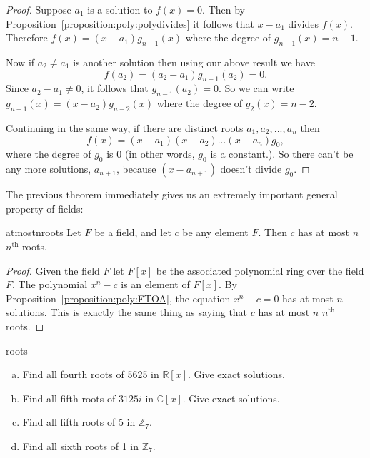 \begin{proof}
Suppose $a_1$ is a solution to $f(x)=0$. Then by Proposition~\ref{proposition:poly:polydivides} it follows that $x-a_1$ divides $f(x)$. Therefore $f(x) = (x-a_1) g_{n-1}(x)$ where the degree of $g_{n-1}(x)=n-1$. 

Now if $a_2 \neq a_1$ is another solution then using our above result we have
\[ f(a_2) = (a_2 - a_1)g_{n-1}(a_2) = 0. \]
Since $a_2 - a_1 \neq 0$, it follows that $g_{n-1}(a_2) = 0$. So we can write $g_{n - 1}(x) = (x-a_2)g_{n-2}(x)$ where the degree of $g_2(x) = n-2$. 

Continuing in the same way, if there are distinct roots $a_1,a_2,...,a_n$ then 
\[
f(x) = (x - a_1)(x - a_2)...(x - a_n)g_0, \]
 where the degree of $g_0$ is 0 (in other words, $g_0$ is a constant.). So there can't be any more solutions, $a_{n+1}$, because $(x-a_{n+1})$ doesn't divide $g_0$.
\end {proof}

The previous theorem immediately gives us an extremely important general property of fields:

\begin{prop}{atmostnroots}
Let $F$ be a field, and let $c$ be any element $F$.  Then $c$ has at most $n$ $n^{\text{th}}$ roots.
\end {prop}


\begin{proof}
Given the field $F$ let $F[x]$ be the associated polynomial ring over the field $F$. The polynomial $x^n-c$ is an element of $F[x]$. By Proposition~\ref{proposition:poly:FTOA}, the equation $x^n-c=0$ has at most $n$ solutions.  This is exactly the same thing as saying that $c$ has at most $n$ $n^{\text{th}}$ roots.
\end {proof}

\begin{exercise}{roots}
\begin {enumerate}[(a)]
\item
Find all fourth roots of 5625 in $\mathbb{R}[x]$. Give exact solutions.
\item
Find all fifth roots of $3125i$ in $\mathbb{C}[x]$. Give exact solutions. 
\item
Find all fifth roots of 5 in $\mathbb{Z}_7$.
\item
Find all sixth roots of 1 in $\mathbb{Z}_7$.
\end{enumerate}
\end{exercise}


